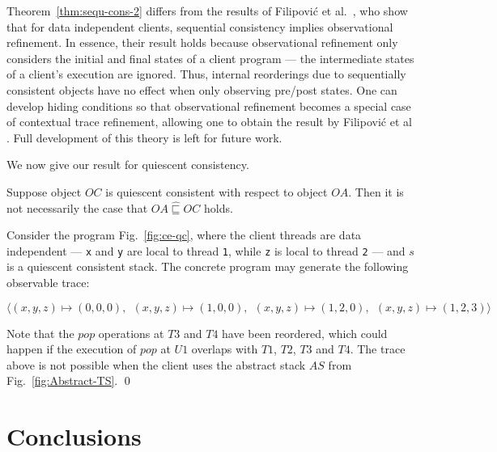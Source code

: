 \documentclass[11pt]{llncs}
\def \srefc  {\mathbin{\widehat{\sqsubseteq}}}
\newcommand{\reffig}[1]{Fig.~\ref{#1}}
\newcommand{\refthm}[1]{Theorem~\ref{#1}}
\begin{document}
\refthm{thm:sequ-cons-2} differs from the results of Filipovi\'{c} et
al.\ \cite{FORY10}, who show that for data independent clients,
sequential consistency implies observational refinement. In essence,
their result holds because observational refinement only considers the
initial and final states of a client program --- the intermediate
states of a client's execution are ignored. Thus, internal reorderings
due to sequentially consistent objects have no effect when only
observing pre/post states. One can develop hiding conditions so that
observational refinement becomes a special case of contextual trace
refinement, allowing one to obtain the result by Filipovi\'{c} et al
\cite{FORY10}. Full development of this theory is left for future
work.


We now give our result for quiescent consistency.
\begin{theorem}
  \label{thm:qc-2}
  Suppose object $OC$ is quiescent consistent with respect to object
  $OA$. Then it is not necessarily the case that $OA \srefc OC$ holds.
\end{theorem}
Consider the program \reffig{fig:ce-qc}, where the client threads are
data independent --- {\tt x} and {\tt y} are local to thread {\tt 1},
while {\tt z} is local to thread {\tt 2} --- and $s$ is a quiescent
consistent stack. The concrete program may generate the following
observable trace: \noindent\smallskip

  \noindent\hfill$
  \langle (x, y, z) \mapsto (0, 0,
  0), \ \ (x, y, z) \mapsto (1,0,0), \ \ (x, y, z) \mapsto (1,2,0), \
  \ (x, y, z) \mapsto (1,2,3)\rangle
  $\hfill\smallskip

  \noindent Note that the $pop$ operations at $T3$ and $T4$ have been
  reordered, which could happen if the execution of $pop$ at $U1$
  overlaps with $T1$, $T2$, $T3$ and $T4$. The trace above is not
  possible when the client uses the abstract stack $AS$ from
  \reffig{fig:Abstract-TS}.  \hfill \qed
\vspace{-2mm}


\section{Conclusions}
\end{document}
